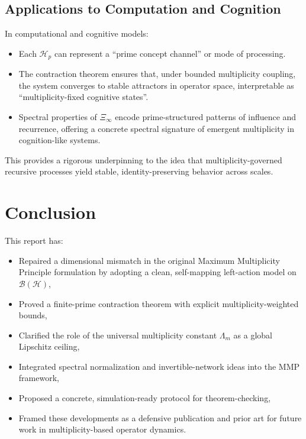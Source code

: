 \documentclass[12pt]{article}
\begin{document}
\subsection{Applications to Computation and Cognition}

In computational and cognitive models:

\begin{itemize}
  \item Each \(\mathcal{H}_p\) can represent a ``prime concept channel'' or mode of processing.
  \item The contraction theorem ensures that, under bounded multiplicity coupling, the system converges to stable attractors in operator space, interpretable as ``multiplicity-fixed cognitive states''.
  \item Spectral properties of \(\Xi_\infty\) encode prime-structured patterns of influence and recurrence, offering a concrete spectral signature of emergent multiplicity in cognition-like systems.
\end{itemize}

This provides a rigorous underpinning to the idea that multiplicity-governed recursive processes yield stable, identity-preserving behavior across scales.

\section{Conclusion}

This report has:

\begin{itemize}
  \item Repaired a dimensional mismatch in the original Maximum Multiplicity Principle formulation by adopting a clean, self-mapping left-action model on \(\mathcal{B}(\mathcal{H})\),
  \item Proved a finite-prime contraction theorem with explicit multiplicity-weighted bounds,
  \item Clarified the role of the universal multiplicity constant \(\Lambda_m\) as a global Lipschitz ceiling,
  \item Integrated spectral normalization and invertible-network ideas into the MMP framework,
  \item Proposed a concrete, simulation-ready protocol for theorem-checking,
  \item Framed these developments as a defensive publication and prior art for future work in multiplicity-based operator dynamics.
\end{itemize}
\end{document}
